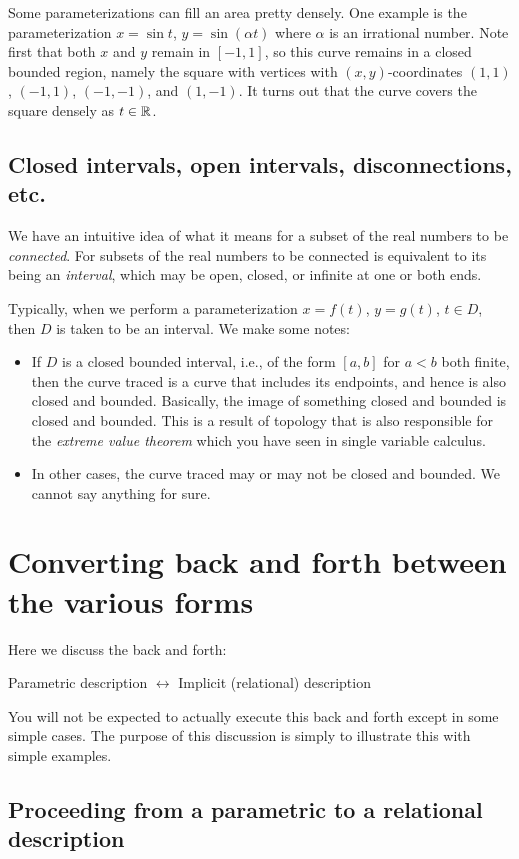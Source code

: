 \documentclass[10pt]{amsart}
\begin{document}
Some parameterizations can fill an area pretty densely. One example is
the parameterization $x = \sin t$, $y = \sin(\alpha t)$ where $\alpha$
is an irrational number. Note first that both $x$ and $y$ remain in
$[-1,1]$, so this curve remains in a closed bounded region, namely the
square with vertices with $(x,y)$-coordinates $(1,1)$, $(-1,1)$,
$(-1,-1)$, and $(1,-1)$. It turns out that the curve covers the square
densely as $t \in \mathbb{R}$.

\subsection{Closed intervals, open intervals, disconnections, etc.}

We have an intuitive idea of what it means for a subset of the real
numbers to be {\em connected}. For subsets of the real numbers to be
connected is equivalent to its being an {\em interval}, which may be
open, closed, or infinite at one or both ends.

Typically, when we perform a parameterization $x = f(t)$, $y = g(t)$,
$t \in D$, then $D$ is taken to be an interval. We make some notes:

\begin{itemize}
\item If $D$ is a closed bounded interval, i.e., of the form $[a,b]$
  for $a < b$ both finite, then the curve traced is a curve that
  includes its endpoints, and hence is also closed and
  bounded. Basically, the image of something closed and bounded is
  closed and bounded. This is a result of topology that is also
  responsible for the {\em extreme value theorem} which you have seen
  in single variable calculus.
\item In other cases, the curve traced may or may not be closed and
  bounded. We cannot say anything for sure.
\end{itemize}
\section{Converting back and forth between the various forms}

Here we discuss the back and forth:

Parametric description $\leftrightarrow$ Implicit (relational) description

You will not be expected to actually execute this back and forth except
in some simple cases. The purpose of this discussion is simply to
illustrate this with simple examples.
\subsection{Proceeding from a parametric to a relational description}
\end{document}
